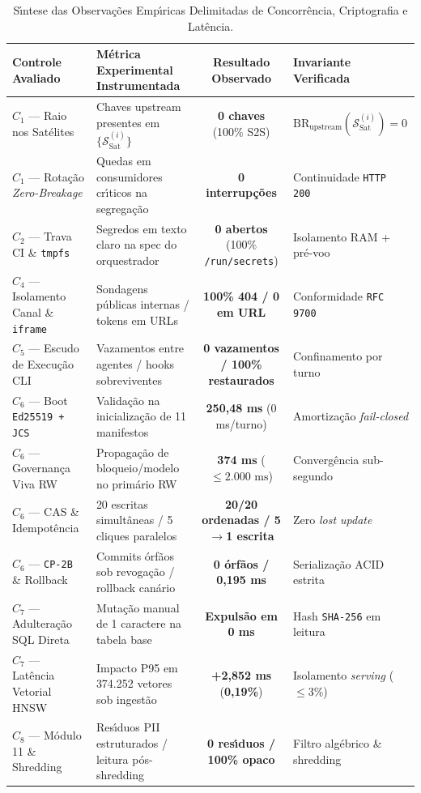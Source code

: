 \documentclass[10pt,twocolumn]{article}
\begin{document}
\begin{table}[t]
\centering
\caption{S\'{\i}ntese das Observa\c{c}\~{o}es Emp\'{\i}ricas Delimitadas de Concorr\^{e}ncia, Criptografia e Lat\^{e}ncia.}
\label{tab:empirical_pt}
\footnotesize
\begin{tabularx}{\textwidth}{@{}l Y c l@{}}
\toprule
\textbf{Controle Avaliado} & \textbf{M\'{e}trica Experimental Instrumentada} & \textbf{Resultado Observado} & \textbf{Invariante Verificada} \\
\midrule
$C_1$ --- Raio nos Sat\'{e}lites & Chaves upstream presentes em $\{\mathcal{S}_{\mathrm{Sat}}^{(i)}\}$ & \textbf{0 chaves} (100\% S2S) & $\mathrm{BR}_{\mathrm{upstream}}(\mathcal{S}_{\mathrm{Sat}}^{(i)}) = 0$ \\
$C_1$ --- Rota\c{c}\~{a}o \emph{Zero-Breakage} & Quedas em consumidores cr\'{\i}ticos na segrega\c{c}\~{a}o & \textbf{0 interrup\c{c}\~{o}es} & Continuidade \texttt{HTTP 200} \\
$C_2$ --- Trava CI \& \texttt{tmpfs} & Segredos em texto claro na spec do orquestrador & \textbf{0 abertos} (100\% \texttt{/run/secrets}) & Isolamento RAM + pr\'{e}-voo \\
$C_4$ --- Isolamento Canal \& \texttt{iframe} & Sondagens p\'{u}blicas internas / tokens em URLs & \textbf{100\% 404 / 0 em URL} & Conformidade \texttt{RFC 9700} \\
$C_5$ --- Escudo de Execu\c{c}\~{a}o CLI & Vazamentos entre agentes / hooks sobreviventes & \textbf{0 vazamentos / 100\% restaurados} & Confinamento por turno \\
$C_6$ --- Boot \texttt{Ed25519 + JCS} & Valida\c{c}\~{a}o na inicializa\c{c}\~{a}o de 11 manifestos & \textbf{250,48 ms} (0 ms/turno) & Amortiza\c{c}\~{a}o \emph{fail-closed} \\
$C_6$ --- Governan\c{c}a Viva RW & Propaga\c{c}\~{a}o de bloqueio/modelo no prim\'{a}rio RW & \textbf{374 ms} ($\le 2.000\text{ ms}$) & Converg\^{e}ncia sub-segundo \\
$C_6$ --- CAS \& Idempot\^{e}ncia & 20 escritas simult\^{a}neas / 5 cliques paralelos & \textbf{20/20 ordenadas / 5$\to$1 escrita} & Zero \emph{lost update} \\
$C_6$ --- \texttt{CP-2B} \& Rollback & Commits \'{o}rf\~{a}os sob revoga\c{c}\~{a}o / rollback can\'{a}rio & \textbf{0 \'{o}rf\~{a}os / 0,195 ms} & Serializa\c{c}\~{a}o ACID estrita \\
$C_7$ --- Adultera\c{c}\~{a}o SQL Direta & Muta\c{c}\~{a}o manual de 1 caractere na tabela base & \textbf{Expuls\~{a}o em 0 ms} & Hash \texttt{SHA-256} em leitura \\
$C_7$ --- Lat\^{e}ncia Vetorial HNSW & Impacto P95 em 374.252 vetores sob ingest\~{a}o & \textbf{+2,852 ms} (\textbf{0,19\%}) & Isolamento \emph{serving} ($\le 3\%$) \\
$C_8$ --- M\'{o}dulo 11 \& Shredding & Res\'{\i}duos PII estruturados / leitura p\'{o}s-shredding & \textbf{0 res\'{\i}duos / 100\% opaco} & Filtro alg\'{e}brico \& shredding \\
\bottomrule
\end{tabularx}
\end{table}
\end{document}
